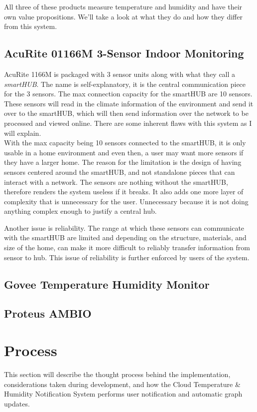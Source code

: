 \documentclass{article}
\begin{document}
All three of these products measure temperature and humidity and have their own value propositions. We'll take a look at what they do and how they differ from this system.

\subsection{AcuRite 01166M 3-Sensor Indoor Monitoring}
AcuRite 1166M is packaged with 3 sensor units along with what they call a \textit{smartHUB}. The name is self-explanatory, it is the central communication piece for the 3 sensors. The max connection capacity for the smartHUB are 10 sensors. These sensors will read in the climate information of the environment and send it over to the smartHUB, which will then send information over the network to be processed and viewed online. There are some inherent flaws with this system as I will explain.\\

With the max capacity being 10 sensors connected to the smartHUB, it is only usable in a home environment and even then, a user may want more sensors if they have a larger home. The reason for the limitation is the design of having sensors centered around the smartHUB, and not standalone pieces that can interact with a network. The sensors are nothing without the smartHUB, therefore renders the system useless if it breaks. It also adds one more layer of complexity that is unnecessary for the user. Unnecessary because it is not doing anything complex enough to justify a central hub.

Another issue is reliability. The range at which these sensors can communicate with the smartHUB are limited and depending on the structure, materials, and size of the home, can make it more difficult to reliably transfer information from sensor to hub. This issue of reliability is further enforced by users of the system.

\subsection{Govee Temperature Humidity Monitor}
\subsection{Proteus AMBIO}

\section{Process}
This section will describe the thought process behind the implementation, considerations taken during development, and how the Cloud Temperature \& Humidity Notification System performs user notification and automatic graph updates.
\end{document}
